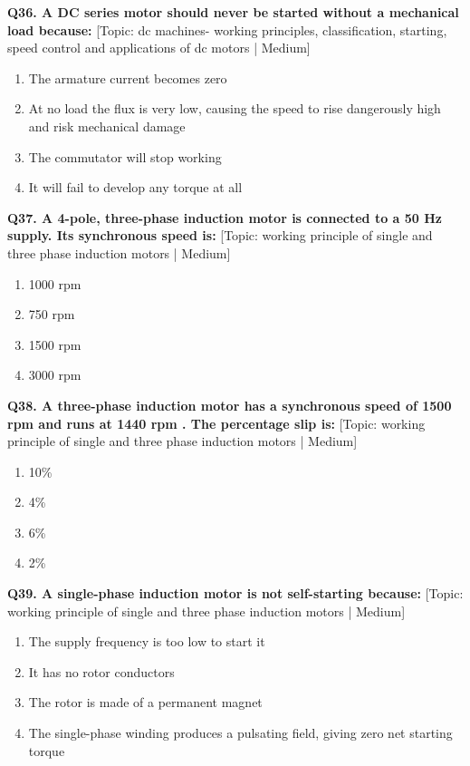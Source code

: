 \noindent\textbf{Q36. A DC series motor should never be started without a mechanical load because:} \hfill [Topic: dc machines- working principles, classification, starting, speed control and applications of dc motors | Medium]
\begin{enumerate}[label=(\alph*),topsep=2pt,itemsep=1pt,partopsep=0pt,parsep=0pt]
    \item {The armature current becomes zero}
    \item {At no load the flux is very low, causing the speed to rise dangerously high and risk mechanical damage}
    \item {The commutator will stop working}
    \item {It will fail to develop any torque at all}
\end{enumerate}
\vspace{2mm}

\noindent\textbf{Q37. A 4-pole, three-phase induction motor is connected to a 50 Hz supply. Its synchronous speed is:} \hfill [Topic: working principle of single and three phase induction motors | Medium]
\begin{enumerate}[label=(\alph*),topsep=2pt,itemsep=1pt,partopsep=0pt,parsep=0pt]
    \item {1000 rpm}
    \item {750 rpm}
    \item {1500 rpm}
    \item {3000 rpm}
\end{enumerate}
\vspace{2mm}

\noindent\textbf{Q38. A three-phase induction motor has a synchronous speed of 1500 rpm and runs at 1440 rpm . The percentage slip is:} \hfill [Topic: working principle of single and three phase induction motors | Medium]
\begin{enumerate}[label=(\alph*),topsep=2pt,itemsep=1pt,partopsep=0pt,parsep=0pt]
    \item {10\%}
    \item {4\%}
    \item {6\%}
    \item {2\%}
\end{enumerate}
\vspace{2mm}

\noindent\textbf{Q39. A single-phase induction motor is not self-starting because:} \hfill [Topic: working principle of single and three phase induction motors | Medium]
\begin{enumerate}[label=(\alph*),topsep=2pt,itemsep=1pt,partopsep=0pt,parsep=0pt]
    \item {The supply frequency is too low to start it}
    \item {It has no rotor conductors}
    \item {The rotor is made of a permanent magnet}
    \item {The single-phase winding produces a pulsating field, giving zero net starting torque}
\end{enumerate}
\vspace{2mm}

